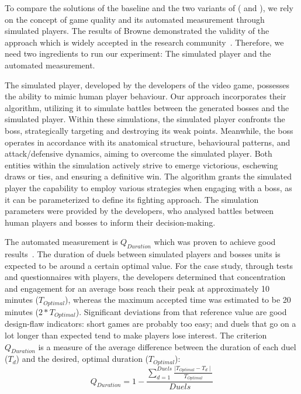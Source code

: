 To compare the solutions of the baseline and the two variants of \ApproachName{} (\simhotep{} and \timhotep{}), we rely on the concept of game quality and its automated measurement through simulated players. The results of Browne \etal demonstrated the validity of the approach which is widely accepted in the research community~\cite{browne2010evolutionary}. Therefore, we need two ingredients to run our experiment: The simulated player and the automated measurement.

The simulated player, developed by the developers of the \CaseStudy{} video game, possesses the ability to mimic human player behaviour. Our approach incorporates their algorithm, utilizing it to simulate battles between the generated bosses and the simulated player. Within these simulations, the simulated player confronts the boss, strategically targeting and destroying its weak points. Meanwhile, the boss operates in accordance with its anatomical structure, behavioural patterns, and attack/defensive dynamics, aiming to overcome the simulated player. Both entities within the simulation actively strive to emerge victorious, eschewing draws or ties, and ensuring a definitive win. The algorithm grants the simulated player the capability to employ various strategies when engaging with a boss, as it can be parameterized to define its fighting approach. The simulation parameters were provided by the developers, who analysed battles between human players and bosses to inform their decision-making.

The automated measurement is $Q_{Duration}$ which was proven to achieve good results~\cite{browne2010evolutionary}. The duration of duels between simulated players and bosses units is expected to be around a certain optimal value. For the \CaseStudy{} case study, through tests and questionnaires with players, the developers determined that concentration and engagement for an average boss reach their peak at approximately 10 minutes ($T_{Optimal}$), whereas the maximum accepted time was estimated to be 20 minutes ($2*T_{Optimal}$). Significant deviations from that reference value are good design-flaw indicators: short games are probably too easy; and duels that go on a lot longer than expected tend to make players lose interest. The criterion $Q_{Duration}$ is a measure of the average difference between the duration of each duel ($T_{d}$) and the desired, optimal duration ($T_{Optimal}$):
\begin{equation}
Q_{Duration} =  1 - \frac{\sum\limits_{d=1}^{Duels}\frac{\mid T_{Optimal} - T_{d} \mid}{T_{Optimal}}}{Duels} 
\end{equation}

